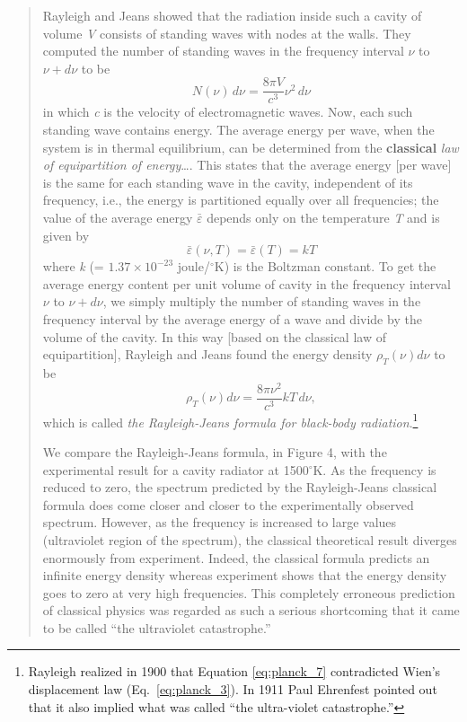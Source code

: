 \begin{quotation}
Rayleigh and Jeans showed that the radiation inside such a cavity of
volume \emph{V} consists of standing waves with nodes at the walls. They
computed the number of standing waves in the frequency interval $\nu$
to $\nu + d\nu$ to be
%
\begin{equation}
N(\nu)\, d\nu = \frac{8\pi V}{c^3}\nu^{2}\, d\nu %
\end{equation}
%
in which \emph{c} is the velocity of electromagnetic waves. Now, each
such standing wave contains energy. The average energy per wave, when
the system is in thermal equilibrium, can be determined from the
\textbf{classical} \emph{law of equipartition of energy}\ldots. This states
that the average energy {[}per wave{]} is the same for each standing
wave in the cavity, independent of its frequency, i.e., the energy is
partitioned equally over all frequencies; the value of the average
energy $\bar{\varepsilon}$ depends only on the temperature \emph{T} and is given by
%
\begin{equation}\label{eq:planck_6}
\bar{\varepsilon}(\nu, T) = \bar{\varepsilon}(T) = kT %
\end{equation}
%
where \emph{k} (= $1.37 \times 10^{-23}$ joule/$^\circ$K) is the
Boltzman constant. To get the average energy content per unit volume of
cavity in the frequency interval $\nu$ to $\nu\! +\! d\nu$, we
simply multiply the number of standing waves in the frequency interval
by the average energy of a wave and divide by the volume of the cavity.
In this way {[}based on the classical law of equipartition{]}, Rayleigh
and Jeans found the energy density $\rho_T(\nu) d\nu$ to be
%
\begin{equation}\label{eq:planck_7}
\rho_T(\nu) d\nu = \frac{8\pi \nu^2}{c^3}kT\, d\nu, %
\end{equation}
%
which is called \emph{the Rayleigh-Jeans formula for black-body
radiation}.\footnote{Rayleigh realized in 1900 that Equation \eqref{eq:planck_7}
  contradicted Wien's displacement law (Eq.\ \ref{eq:planck_3}). In 1911 Paul Ehrenfest
  pointed out that it also implied what was called ``the ultra-violet
  catastrophe.''}

We compare the Rayleigh-Jeans formula, in Figure 4, with the
experimental result for a cavity radiator at 1500$^\circ$K. As the frequency is
reduced to zero, the spectrum predicted by the Rayleigh-Jeans classical
formula does come closer and closer to the experimentally observed
spectrum. However, as the frequency is increased to large values
(ultraviolet region of the spectrum), the classical theoretical
result diverges enormously from experiment. Indeed, the classical
formula predicts an infinite energy density whereas experiment shows
that the energy density goes to zero at very high frequencies. This
completely erroneous prediction of classical physics was regarded as
such a serious shortcoming that it came to be called ``the ultraviolet
catastrophe.''


\end{quotation}
